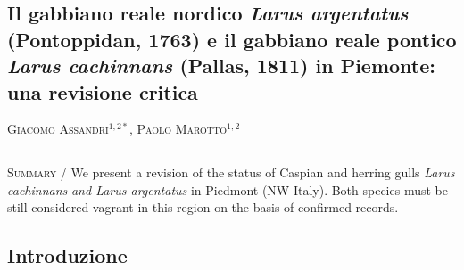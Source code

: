 \setcounter{figure}{0}
\setcounter{table}{0}

\begin{adjustwidth}{-3.5cm}{0cm}
\pagestyle{CIOpage}
\chapter*[Il gabbiano reale nordico e il gabbiano reale pontico in
Piemonte. Una revisione critica]{Il gabbiano reale nordico \textbf{\textit{Larus
argentatus}}\textbf{ (Pontoppidan, 1763) e il gabbiano reale pontico
}\textbf{\textit{Larus cachinnans}}\textbf{ (Pallas, 1811) in Piemonte:
una revisione critica}}

\textsc{Giacomo Assandri}$^{1,2*}$, \textsc{Paolo Marotto}$^{1,2}$\\

 
\noindent\color{MUSEBLUE}\rule{27cm}{2pt}
\vspace{1cm}
\end{adjustwidth}



{\small
\noindent \textsc{\color{MUSEBLUE} Summary} / We present a revision of the status of Caspian and herring gulls
\textit{Larus cachinnans}\textit{ and Larus argentatus} in Piedmont (NW
Italy). Both species must be still considered vagrant in this region on
the basis of confirmed records.
}


\section*{Introduzione}

